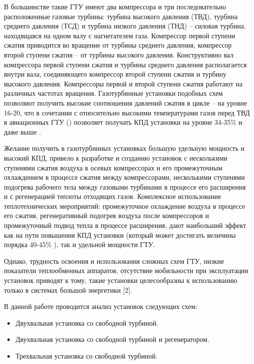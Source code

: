 В большинстве такие ГТУ имеют два компрессора и три последовательно расположенные газовые турбины: турбина высокого
давления (ТВД), турбина среднего давления (ТСД) и турбина низкого давления (ТНД) – силовая турбина, находящаяся на одном
валу с нагнетателем газа. Компрессор первой ступени сжатия приводится во вращение от турбины среднего  давления,
компрессор второй ступени сжатия – от турбины высокого давления. Конструктивно вал компрессора первой ступени сжатия и
турбины среднего давления   располагается внутри вала, соединяющего компрессор второй ступени сжатия и турбину высокого
давления.  Компрессоры первой и второй ступени сжатия  работают на различных частотах вращения. Газотурбинные установки
подобных схем позволяют получить высокие соотношения давлений сжатия в цикле – на уровне 16-20, что в сочетании с относительно
высокими температурами газов перед ТВД в авиационных ГТУ () позволяет получать КПД установки на уровне 34-35\% и даже выше \cite{gtd_tomsk}.

Желание получить в газотурбинных установках большую удельную мощность и высокий КПД, привело к разработке и созданию
установок с несколькими ступенями сжатия воздуха в осевых компрессорах и его промежуточным охлаждением в процессе сжатия
между компрессорами, несколькими ступенями подогрева рабочего тела между газовыми турбинами в процессе его расширения и с
регенерацией теплоты отходящих газов. Комплексное использование теплотехнических мероприятий: промежуточное охлаждение воздуха
в процессе его сжатия, регенеративный подогрев воздуха после компрессоров и промежуточный подвод тепла в процессе расширения,
дают наибольший эффект как на пути повышения КПД установки (который может достигать величины порядка 40-45\% \cite{gtd_oil_and_gas}),
так  и удельной мощности ГТУ.

Однако, трудность освоения и использования сложных схем ГТУ,  низкие показатели теплообменных аппаратов,  отсутствие мобильности при эксплуатации установок приводят к тому, такие установки целесообразны к использованию только в системах большой энергетики [2].

В данной работе проводится анализ установок следующих схем:
\begin{itemize}
	\item Двухвальная установка со свободной турбиной.
	\item Двухвальная установка со свободной турбиной и регенератором.
	\item Трехвальная установка со свободной турбиной.
\end{itemize}

